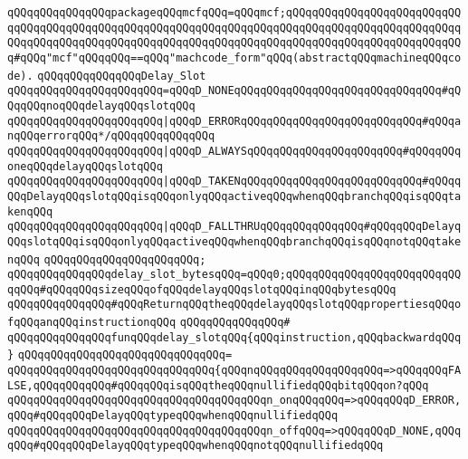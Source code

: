 \verb|qQQqqQQqqQQqqQQqpackageqQQqmcfqQQq=qQQqmcf;qQQqqQQqqQQqqQQqqQQqqQQqqQQqqQQqqQQqqQQqqQQqqQQqqQQqqQQqqQQqqQQqqQQqqQQqqQQqqQQqqQQqqQQqqQQqqQQqqQQqqQQqqQQqqQQqqQQqqQQqqQQqqQQqqQQqqQQqqQQqqQQqqQQqqQQqqQQqqQQqqQQqqQQq#qQQq"mcf"qQQqqQQq==qQQq"machcode_form"qQQq(abstractqQQqmachineqQQqcode).|\newline
\newline
\verb|qQQqqQQqqQQqqQQqDelay_Slot|\newline
\verb|qQQqqQQqqQQqqQQqqQQqqQQq=qQQqD_NONEqQQqqQQqqQQqqQQqqQQqqQQqqQQqqQQq#qQQqqQQqnoqQQqdelayqQQqslotqQQq|\newline
\verb|qQQqqQQqqQQqqQQqqQQqqQQq|\verb#|qQQqD_ERRORqQQqqQQqqQQqqQQqqQQqqQQqqQQq#\verb|#qQQqanqQQqerrorqQQq*/qQQqqQQqqQQqqQQq|\newline
\verb|qQQqqQQqqQQqqQQqqQQqqQQq|\verb#|qQQqD_ALWAYSqQQqqQQqqQQqqQQqqQQqqQQq#\verb|#qQQqqQQqoneqQQqdelayqQQqslotqQQq|\newline
\verb|qQQqqQQqqQQqqQQqqQQqqQQq|\verb#|qQQqD_TAKENqQQqqQQqqQQqqQQqqQQqqQQqqQQq#\verb|#qQQqqQQqDelayqQQqslotqQQqisqQQqonlyqQQqactiveqQQqwhenqQQqbranchqQQqisqQQqtakenqQQq|\newline
\verb|qQQqqQQqqQQqqQQqqQQqqQQq|\verb#|qQQqD_FALLTHRUqQQqqQQqqQQqqQQq#\verb|#qQQqqQQqDelayqQQqslotqQQqisqQQqonlyqQQqactiveqQQqwhenqQQqbranchqQQqisqQQqnotqQQqtakenqQQq|\newline
\verb|qQQqqQQqqQQqqQQqqQQqqQQq;|\newline
\newline
\verb|qQQqqQQqqQQqqQQqdelay_slot_bytesqQQq=qQQq0;qQQqqQQqqQQqqQQqqQQqqQQqqQQqqQQq#qQQqqQQqsizeqQQqofqQQqdelayqQQqslotqQQqinqQQqbytesqQQq|\newline
\newline
\verb|qQQqqQQqqQQqqQQq#qQQqReturnqQQqtheqQQqdelayqQQqslotqQQqpropertiesqQQqofqQQqanqQQqinstructionqQQq|\newline
\verb|qQQqqQQqqQQqqQQq#|\newline
\verb|qQQqqQQqqQQqqQQqfunqQQqdelay_slotqQQq{qQQqinstruction,qQQqbackwardqQQq}|\newline
\verb|qQQqqQQqqQQqqQQqqQQqqQQqqQQqqQQq=|\newline
\verb|qQQqqQQqqQQqqQQqqQQqqQQqqQQqqQQq{qQQqnqQQqqQQqqQQqqQQqqQQq=>qQQqqQQqFALSE,qQQqqQQqqQQq#qQQqqQQqisqQQqtheqQQqnullifiedqQQqbitqQQqon?qQQq|\newline
\verb|qQQqqQQqqQQqqQQqqQQqqQQqqQQqqQQqqQQqqQQqn_onqQQqqQQq=>qQQqqQQqD_ERROR,qQQq#qQQqqQQqDelayqQQqtypeqQQqwhenqQQqnullifiedqQQq|\newline
\verb|qQQqqQQqqQQqqQQqqQQqqQQqqQQqqQQqqQQqqQQqn_offqQQq=>qQQqqQQqD_NONE,qQQqqQQq#qQQqqQQqDelayqQQqtypeqQQqwhenqQQqnotqQQqnullifiedqQQq|\newline
